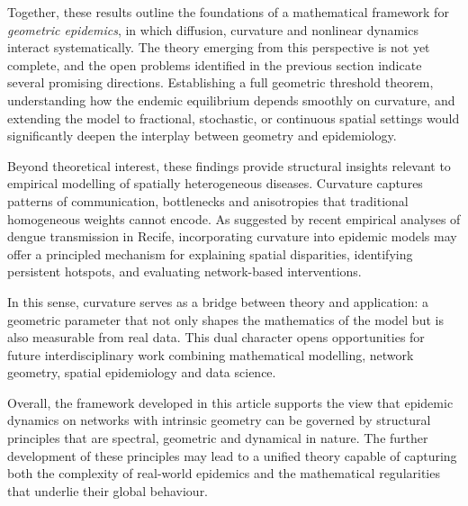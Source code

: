 \documentclass[final,3p,times,twocolumn]{elsarticle}
\begin{document}
Together, these results outline the foundations of a mathematical framework for
\emph{geometric epidemics}, in which diffusion, curvature and nonlinear
dynamics interact systematically. The theory emerging from this perspective is
not yet complete, and the open problems identified in the previous section
indicate several promising directions. Establishing a full geometric threshold
theorem, understanding how the endemic equilibrium depends smoothly on
curvature, and extending the model to fractional, stochastic, or continuous
spatial settings would significantly deepen the interplay between geometry and
epidemiology.

Beyond theoretical interest, these findings provide structural insights relevant
to empirical modelling of spatially heterogeneous diseases. Curvature captures
patterns of communication, bottlenecks and anisotropies that traditional
homogeneous weights cannot encode. As suggested by recent empirical analyses of
dengue transmission in Recife, incorporating curvature into epidemic models may
offer a principled mechanism for explaining spatial disparities, identifying
persistent hotspots, and evaluating network-based interventions.

In this sense, curvature serves as a bridge between theory and application:
a geometric parameter that not only shapes the mathematics of the model but is
also measurable from real data. This dual character opens opportunities for
future interdisciplinary work combining mathematical modelling, network
geometry, spatial epidemiology and data science.

Overall, the framework developed in this article supports the view that epidemic
dynamics on networks with intrinsic geometry can be governed by structural
principles that are spectral, geometric and dynamical in nature. The further
development of these principles may lead to a unified theory capable of
capturing both the complexity of real-world epidemics and the mathematical
regularities that underlie their global behaviour.
\end{document}
